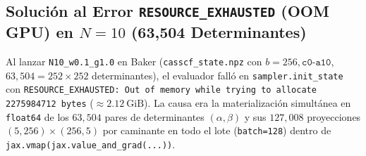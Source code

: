 \documentclass[10pt,a4paper]{article}
\begin{document}
\subsection{Solución al Error \texttt{RESOURCE\_EXHAUSTED} (OOM GPU) en $N=10$ (63,504 Determinantes)}

Al lanzar \texttt{N10\_w0.1\_g1.0} en Baker (\texttt{casscf\_state.npz} con $b=256, \texttt{c0-a10}$, $63{,}504 = 252 \times 252$ determinantes), el evaluador falló en \texttt{sampler.init\_state} con \texttt{RESOURCE\_EXHAUSTED: Out of memory while trying to allocate 2275984712 bytes} ($\approx 2.12\ \mathrm{GiB}$). La causa era la materialización simultánea en \texttt{float64} de los $63{,}504$ pares de determinantes $(\alpha, \beta)$ y sus $127{,}008$ proyecciones $(5, 256) \times (256, 5)$ por caminante en todo el lote (\texttt{batch=128}) dentro de \texttt{jax.vmap(jax.value\_and\_grad(...))}.
\end{document}
